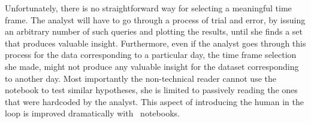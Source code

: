 Unfortunately, there is no straightforward way for selecting a meaningful time frame. The analyst will have to go through a process of trial and error, by issuing an arbitrary number of such queries and plotting the results, until she finds a set that produces valuable insight. Furthermore, even if the analyst goes through this process for the data corresponding to a particular day, the time frame selection she made, might not produce any valuable insight for the dataset corresponding to another day. Most importantly the non-technical reader cannot use the notebook to test similar hypotheses, she is limited to passively reading the ones that were hardcoded by the analyst. This aspect of introducing the human in the loop is improved dramatically with \projname\ notebooks.

\vspace*{-0.4cm}
